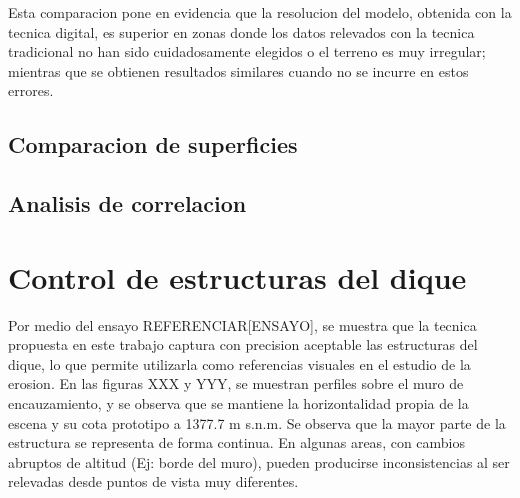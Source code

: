 Esta comparacion pone en evidencia que la resolucion del modelo, obtenida con la tecnica digital, es superior en zonas donde los datos relevados con la tecnica tradicional no han sido cuidadosamente elegidos o el terreno es muy irregular; mientras que se obtienen resultados similares cuando no se incurre en estos errores.

\subsection{Comparacion de superficies}

\subsection{Analisis de correlacion}

\section{Control de estructuras del dique}

Por medio del ensayo REFERENCIAR[ENSAYO], se muestra que la tecnica propuesta en este trabajo captura con precision aceptable las estructuras del dique, lo que permite utilizarla como referencias visuales en el estudio de la erosion. En las figuras XXX y YYY, se muestran perfiles sobre el muro de encauzamiento, y se observa que se mantiene la horizontalidad propia de la escena y su cota prototipo a 1377.7 m s.n.m. Se observa que la mayor parte de la estructura se representa de forma continua. En algunas areas, con cambios abruptos de altitud (Ej: borde del muro), pueden producirse inconsistencias al ser relevadas desde puntos de vista muy diferentes.

